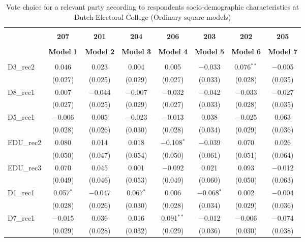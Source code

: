 \documentclass[
]{article}
\begin{document}
\begin{table}[!htbp] \centering 
  \caption{Vote choice for a relevant party according to respondents 
                       socio-demographic characteristics at Dutch Electoral College (Ordinary square models)} 
  \label{table:full_ols_be_du} 
\begin{tabular}{@{\extracolsep{5pt}}lccccccc} 
\\[-1.8ex]\hline \\[-1.8ex] 
 & \textbf{207} & \textbf{201} & \textbf{204} & \textbf{206} & \textbf{203} & \textbf{202} & \textbf{205} \\ 
\\[-1.8ex] & \textbf{Model 1} & \textbf{Model 2} & \textbf{Model 3} & \textbf{Model 4} & \textbf{Model 5} & \textbf{Model 6} & \textbf{Model 7}\\ 
\hline \\[-1.8ex] 
 D3\_rec2 & 0.046 & 0.023 & 0.004 & 0.005 & $-$0.033 & 0.076$^{**}$ & $-$0.005 \\ 
  & (0.027) & (0.025) & (0.029) & (0.027) & (0.033) & (0.028) & (0.035) \\ 
  D8\_rec1 & 0.007 & $-$0.044 & $-$0.007 & $-$0.032 & $-$0.042 & $-$0.033 & $-$0.027 \\ 
  & (0.027) & (0.025) & (0.029) & (0.027) & (0.033) & (0.028) & (0.035) \\ 
  D5\_rec1 & $-$0.006 & 0.005 & $-$0.023 & $-$0.013 & 0.038 & $-$0.025 & 0.063 \\ 
  & (0.028) & (0.026) & (0.030) & (0.028) & (0.034) & (0.029) & (0.036) \\ 
  EDU\_rec2 & 0.080 & 0.014 & 0.018 & $-$0.108$^{*}$ & $-$0.039 & 0.070 & 0.026 \\ 
  & (0.050) & (0.047) & (0.054) & (0.050) & (0.061) & (0.051) & (0.064) \\ 
  EDU\_rec3 & 0.070 & 0.045 & 0.001 & $-$0.092 & 0.021 & 0.093 & $-$0.012 \\ 
  & (0.049) & (0.046) & (0.053) & (0.049) & (0.060) & (0.050) & (0.063) \\ 
  D1\_rec1 & 0.057$^{*}$ & $-$0.047 & 0.067$^{*}$ & 0.006 & $-$0.068$^{*}$ & 0.002 & $-$0.004 \\ 
  & (0.028) & (0.026) & (0.030) & (0.028) & (0.034) & (0.029) & (0.036) \\ 
  D7\_rec1 & $-$0.015 & 0.036 & 0.016 & 0.091$^{**}$ & $-$0.012 & $-$0.006 & $-$0.074 \\ 
  & (0.029) & (0.028) & (0.032) & (0.029) & (0.036) & (0.030) & (0.038) \\ 

\end{tabular}
\end{table}
\end{document}
